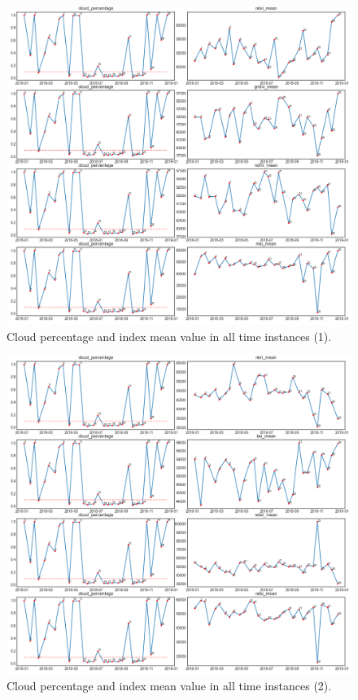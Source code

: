 \documentclass[../main.tex]{subfiles}
\begin{document}
\begin{appendices}
\begin{figure}[H]
	\includegraphics[width=15cm]{imgs/eda/merge/cloud-percentage-each-time-interval-index-1}
	\caption{Cloud percentage and index mean value in all time instances (1).}
	\label{fig:eda-merge-patch-xploration-index-1}
\end{figure}
\begin{figure}[H]
	\centering
	\includegraphics[width=15cm]{imgs/eda/merge/cloud-percentage-each-time-interval-index-2}
	\caption{Cloud percentage and index mean value in all time instances (2).}
	\label{fig:eda-merge-patch-xploration-index-1}
\end{figure}
\end{appendices}
\end{document}
